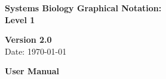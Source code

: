 \begin{titlepage}

\vspace*{0.75in}

\begin{center}

  \textbf{\sffamily\bfseries\huge
    Systems Biology Graphical Notation:\\[0.3em]
    \PDl Level 1}

\vspace*{0.5in}

\Large
\textbf{Version 2.0}\\[0.1in]
\large
Date: \today\\[0.25in]



\vspace{0.5in}

  \textbf{\sffamily\bfseries\huge
    User Manual}



\end{center}
\end{titlepage}
